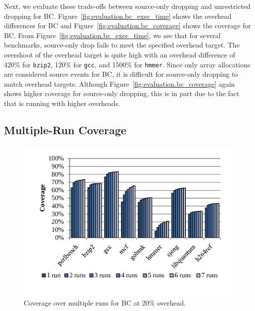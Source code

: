 Next, we evaluate these trade-offs between source-only dropping and unrestricted dropping for BC.
Figure~\ref{fig:evaluation.bc_exec_time} shows the overhead differences for BC
and Figure~\ref{fig:evaluation.bc_coverage} shows the coverage for BC.
From Figure~\ref{fig:evaluation.bc_exec_time}, we see that for several
benchmarks, source-only drop fails to meet the specified overhead target.
The overshoot of the overhead target is quite high with an overhead difference
of 420\% for {\tt bzip2}, 120\% for {\tt gcc}, and 1500\% for {\tt hmmer}.
Since only array allocations are considered source events for BC, it is
difficult for source-only dropping to match overhead targets. Although
Figure~\ref{fig:evaluation.bc_coverage} again shows higher coverage for
source-only dropping, this is in part due to the fact that is running with
higher overheads.

\subsection{Multiple-Run Coverage}

\begin{figure}
  \begin{center}
    \includegraphics[width=\columnwidth]{figs/data_multirun_coverage.pdf}
    \vspace{-0.2in}
    \caption{Coverage over multiple runs for BC at 20\% overhead.}
    \label{fig:evaluation.multirun}
    \vspace{-0.1in}
  \end{center}
\end{figure}

